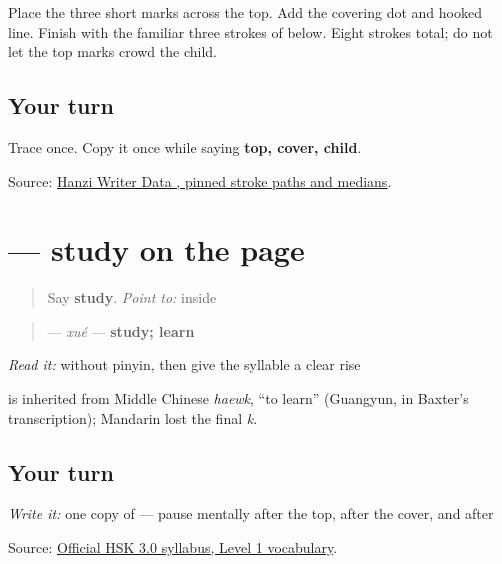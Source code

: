 Place the three short marks across the top. Add the covering dot and hooked line. Finish with the familiar three strokes of  below. Eight strokes total; do not let the top marks crowd the child.

\subsection*{Your turn}
Trace \textbf{} once. Copy it once while saying \textbf{top, cover, child}.

\begin{tcolorbox}[breakable,colback=teal!4,colframe=teal!35!black,title={Before you move on}]
Source: \href{https://raw.githubusercontent.com/chanind/hanzi-writer-data/68d10a4b21150cae5e1ebbd223eed289cf32d90c/data/\%E5\%AD\%A6.json}{Hanzi Writer Data , pinned stroke paths and medians}.
\end{tcolorbox}
\section[\texorpdfstring{\zh{学} (xué)}{学 (xué)}]{ — study on the page}

\label{lesson:ZH-C13-xue}



\begin{quote}
Say \textbf{study}. \emph{Point to:}  inside 
\end{quote}

\begin{cousinweb}
\begin{quote}
\textbf{} — \emph{xué} — \textbf{study; learn}
\end{quote}

\emph{Read it:} \textbf{} without pinyin, then give the syllable a clear rise

\textbf{} is inherited from Middle Chinese \emph{haewk}, \textquotedblleft{}to learn\textquotedblright{} (Guangyun, in Baxter's transcription); Mandarin lost the final \emph{k}.
\end{cousinweb}

\subsection*{Your turn}
\emph{Write it:} one copy of \textbf{} — pause mentally after the top, after the cover, and after 

\begin{tcolorbox}[breakable,colback=teal!4,colframe=teal!35!black,title={Before you move on}]
Source: \href{https://hsk.cn-bj.ufileos.com/3.0/\%E6\%96\%B0\%E7\%89\%88HSK\%E8\%80\%83\%E8\%AF\%95\%E5\%A4\%A7\%E7\%BA\%B21219.pdf}{Official HSK 3.0 syllabus, Level 1 vocabulary}.
\end{tcolorbox}
